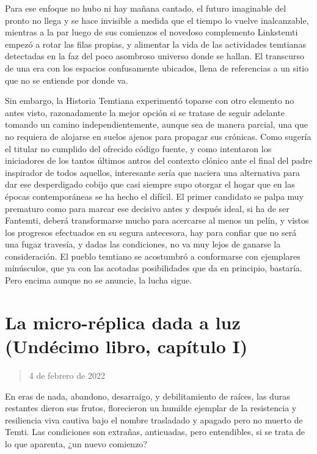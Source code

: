\documentclass[
]{book}
\begin{document}
Para ese enfoque no hubo ni hay mañana cantado, el futuro imaginable del pronto no llega y se hace invisible a medida que el tiempo lo vuelve inalcanzable, mientras a la par luego de sus comienzos el novedoso complemento Linkstemti empezó a rotar las filas propias, y alimentar la vida de las actividades temtianas detectadas en la faz del poco asombroso universo donde se hallan. El transcurso de una era con los espacios confusamente ubicados, llena de referencias a un sitio que no se entiende por donde va.

Sin embargo, la Historia Temtiana experimentó toparse con otro elemento no antes visto, razonadamente la mejor opción si se tratase de seguir adelante tomando un camino independientemente, aunque sea de manera parcial, una que no requiera de alojarse en suelos ajenos para propagar sus crónicas. Como sugería el titular no cumplido del ofrecido código fuente, y como intentaron los iniciadores de los tantos últimos antros del contexto clónico ante el final del padre inspirador de todos aquellos, interesante sería que naciera una alternativa para dar ese desperdigado cobijo que casi siempre supo otorgar el hogar que en las épocas contemporáneas se ha hecho el difícil. El primer candidato se palpa muy prematuro como para marcar ese decisivo antes y después ideal, si ha de ser Fantemti, deberá transformarse mucho para acercarse al menos un pelín, y vistos los progresos efectuados en su segura antecesora, hay para confiar que no será una fugaz travesía, y dadas las condiciones, no va muy lejos de ganarse la consideración. El pueblo temtiano se acostumbró a conformarse con ejemplares minúsculos, que ya con las acotadas posibilidades que da en principio, bastaría. Pero encima aunque no se anuncie, la lucha sigue.

\hypertarget{la-micro-ruxe9plica-dada-a-luz-unduxe9cimo-libro-capuxedtulo-i}{%
\section{La micro-réplica dada a luz (Undécimo libro, capítulo I)}\label{la-micro-ruxe9plica-dada-a-luz-unduxe9cimo-libro-capuxedtulo-i}}

\begin{quote}
4 de febrero de 2022
\end{quote}

En eras de nada, abandono, desarraigo, y debilitamiento de raíces, las duras restantes dieron sus frutos, florecieron un humilde ejemplar de la resistencia y resiliencia viva cautiva bajo el nombre trasladado y apagado pero no muerto de Temti. Las condiciones son extrañas, anticuadas, pero entendibles, si se trata de lo que aparenta, ¿un nuevo comienzo?
\end{document}
